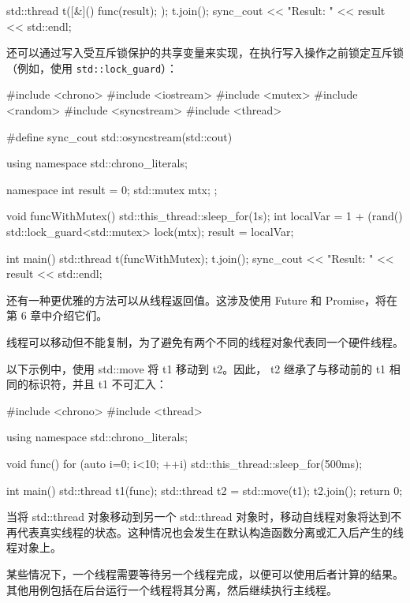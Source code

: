 \begin{cpp}
std::thread t([&]() { func(result); });
t.join();
sync_cout << "Result: " << result << std::endl;
\end{cpp}

还可以通过写入受互斥锁保护的共享变量来实现，在执行写入操作之前锁定互斥锁（例如，使用 \verb|std::lock_guard|）：

\begin{cpp}
#include <chrono>
#include <iostream>
#include <mutex>
#include <random>
#include <syncstream>
#include <thread>

#define sync_cout std::osyncstream(std::cout)

using namespace std::chrono_literals;

namespace {
    int result = 0;
    std::mutex mtx;
};

void funcWithMutex() {
    std::this_thread::sleep_for(1s);
    int localVar = 1 + (rand() %
    std::lock_guard<std::mutex> lock(mtx);
    result = localVar;
}

int main() {
    std::thread t(funcWithMutex);
    t.join();
    sync_cout << "Result: " << result << std::endl;
}
\end{cpp}

还有一种更优雅的方法可以从线程返回值。这涉及使用 Future 和 Promise，将在第 6 章中介绍它们。


线程可以移动但不能复制，为了避免有两个不同的线程对象代表同一个硬件线程。

以下示例中，使用 std::move 将 t1 移动到 t2。因此， t2 继承了与移动前的 t1 相同的标识符，并且 t1 不可汇入：

\begin{cpp}
#include <chrono>
#include <thread>

using namespace std::chrono_literals;

void func() {
    for (auto i=0; i<10; ++i) {
        std::this_thread::sleep_for(500ms);
    }
}

int main() {
    std::thread t1(func);
    std::thread t2 = std::move(t1);
    t2.join();
    return 0;
}
\end{cpp}

当将 std::thread 对象移动到另一个 std::thread 对象时，移动自线程对象将达到不再代表真实线程的状态。这种情况也会发生在默认构造函数分离或汇入后产生的线程对象上。


某些情况下，一个线程需要等待另一个线程完成，以便可以使用后者计算的结果。其他用例包括在后台运行一个线程将其分离，然后继续执行主线程。

